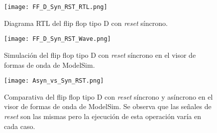 \begin{figure}[ht]
	\centering
	\texttt{[image: FF\_D\_Syn\_RST\_RTL.png]}
	\caption{Diagrama RTL del flip flop tipo D con \textit{reset} síncrono. \label{fig:ff_d_syn_rtl}}
\end{figure}

\begin{figure}[ht]
	\centering
	\texttt{[image: FF\_D\_Syn\_RST\_Wave.png]}
	\caption{Simulación del flip flop tipo D con \textit{reset} síncrono en el visor de formas de onda de ModelSim. 
	\label{fig:ff_d_syn_wave}}
\end{figure}

\begin{figure}[ht]
	\centering
	\texttt{[image: Asyn\_vs\_Syn\_RST.png]}
	\caption{Comparativa del flip flop tipo D con \textit{reset} síncrono y asíncrono en el visor de formas de onda de ModelSim. Se observa que las señales de \textit{reset} son las mismas pero la ejecución de esta operación varía en cada caso.
	\label{fig:asyn_vs_syn_wave}}
\end{figure}